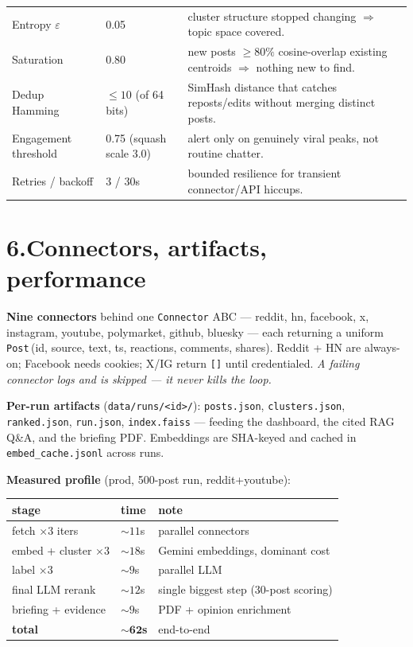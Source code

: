 \documentclass[11pt,a4paper]{article}
\newcommand{\code}[1]{\texttt{\small #1}}
\begin{document}
\begin{center}
\begin{tabular}{@{}>{\raggedright}p{3.0cm} l p{8.6cm}@{}}
Entropy $\varepsilon$ & 0.05 &
cluster structure stopped changing $\Rightarrow$ topic space covered. \\
Saturation & 0.80 &
new posts $\ge80\%$ cosine-overlap existing centroids $\Rightarrow$ nothing new
to find. \\
Dedup Hamming & $\le10$ (of 64 bits) &
SimHash distance that catches reposts/edits without merging distinct posts. \\
Engagement threshold & 0.75 (squash scale 3.0) &
alert only on genuinely viral peaks, not routine chatter. \\
Retries / backoff & 3 / 30s &
bounded resilience for transient connector/API hiccups. \\
\bottomrule
\end{tabular}
\end{center}

\section*{6.\quad Connectors, artifacts, performance}

\noindent\textbf{Nine connectors} behind one \code{Connector} ABC --- reddit,
hn, facebook, x, instagram, youtube, polymarket, github, bluesky --- each
returning a uniform \code{Post}\,(id, source, text, ts, reactions, comments,
shares). Reddit + HN are always-on; Facebook needs cookies; X/IG return
\code{[]} until credentialed. \emph{A failing connector logs and is skipped ---
it never kills the loop.}

\smallskip
\noindent\textbf{Per-run artifacts} (\code{data/runs/<id>/}):
\code{posts.json}, \code{clusters.json}, \code{ranked.json}, \code{run.json},
\code{index.faiss} --- feeding the dashboard, the cited RAG Q\&A, and the
briefing PDF. Embeddings are SHA-keyed and cached in \code{embed\_cache.jsonl}
across runs.

\smallskip
\noindent\textbf{Measured profile} (prod, 500-post run, reddit+youtube):
\renewcommand{\arraystretch}{1.1}
\begin{center}\small
\begin{tabular}{@{}lll@{}}
\toprule
stage & time & note\\\midrule
fetch $\times3$ iters & $\sim11$s & parallel connectors \\
embed + cluster $\times3$ & $\sim18$s & Gemini embeddings, dominant cost \\
label $\times3$ & $\sim9$s & parallel LLM \\
final LLM rerank & $\sim12$s & single biggest step (30-post scoring) \\
briefing + evidence & $\sim9$s & PDF + opinion enrichment \\
\midrule \textbf{total} & $\sim\mathbf{62}$\textbf{s} & end-to-end \\
\bottomrule
\end{tabular}
\end{center}
\end{document}
